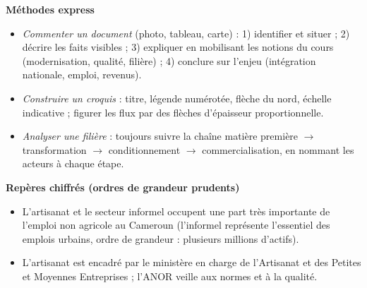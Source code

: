 \documentclass[11pt]{article}
\begin{document}
\begin{bilan}
\textbf{Méthodes express}
\begin{itemize}
  \item \emph{Commenter un document} (photo, tableau, carte) : 1) identifier et situer ; 2) décrire les faits visibles ; 3) expliquer en mobilisant les notions du cours (modernisation, qualité, filière) ; 4) conclure sur l'enjeu (intégration nationale, emploi, revenus).
  \item \emph{Construire un croquis} : titre, légende numérotée, flèche du nord, échelle indicative ; figurer les flux par des flèches d'épaisseur proportionnelle.
  \item \emph{Analyser une filière} : toujours suivre la chaîne matière première $\rightarrow$ transformation $\rightarrow$ conditionnement $\rightarrow$ commercialisation, en nommant les acteurs à chaque étape.
\end{itemize}

\textbf{Repères chiffrés (ordres de grandeur prudents)}
\begin{itemize}
  \item L'artisanat et le secteur informel occupent une part très importante de l'emploi non agricole au Cameroun (l'informel représente l'essentiel des emplois urbains, ordre de grandeur : plusieurs millions d'actifs).
  \item L'artisanat est encadré par le ministère en charge de l'Artisanat et des Petites et Moyennes Entreprises ; l'ANOR veille aux normes et à la qualité.
\end{itemize}
\end{bilan}
\end{document}

